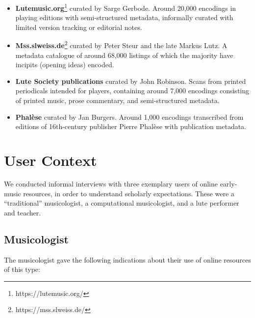 \documentclass[twocolumn,10pt]{paper}
\begin{document}
\begin{sloppypar}
  \begin{itemize}
    \item {\bf Lutemusic.org}\footnote{https://lutemusic.org/} curated
      by Sarge Gerbode. Around 20,000 encodings in playing editions
      with semi-structured metadata, informally curated with limited
      version tracking or editorial notes.
    \item {\bf Mss.slweiss.de}\footnote{https://mss.slweiss.de/}
      curated by Peter Steur and the late Markus Lutz. A metadata
      catalogue of around 68,000 listings of which the majority have
      incipits (opening ideas) encoded.
    \item {\bf Lute Society publications} curated by John
      Robinson. Scans from printed periodicals intended for players,
      containing around 7,000 encodings consisting of printed music,
      prose commentary, and semi-structured metadata.
    \item {\bf Phal\`ese} curated by Jan Burgers. Around 1,000
      encodings transcribed from editions of 16th-century publisher
      Pierre Phal\`ese with publication metadata.

  \end{itemize}

  
  \section{User Context}

  We conducted informal interviews with three exemplary users of
  online early-music resources, in order to understand scholarly
  expectations. These were a ``traditional'' musicologist, a
  computational musicologist, and a lute performer and teacher.
  
  \subsection{Musicologist}

  The musicologist gave the following indications about their use of
  online resources of this type:


\end{sloppypar}
\end{document}
